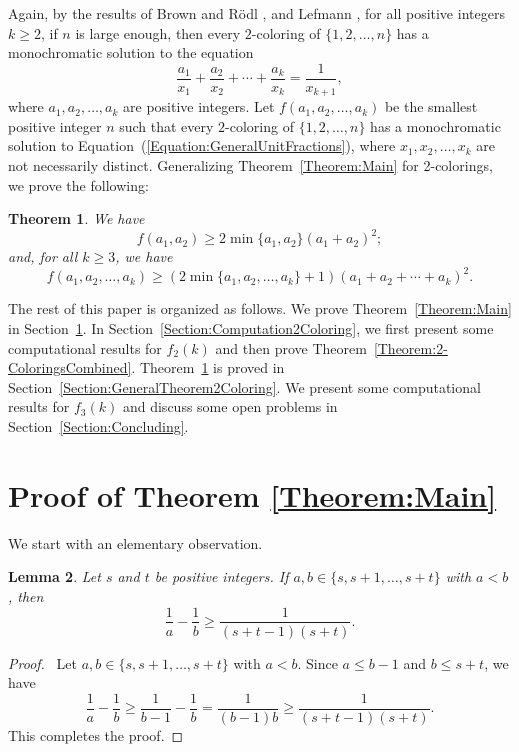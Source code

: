 \documentclass[11pt]{article}
\newtheorem{theorem}{Theorem}[section]
\newtheorem{lemma}[theorem]{Lemma}
\theoremstyle{definition}
\begin{document}
Again, by the results of Brown and R\"{o}dl \cite{BrownRodl1991}, and Lefmann \cite{Lefmann1991}, for all positive integers $k\geq2$, if $n$ is large enough, then every $2$-coloring of $\{1,2,\ldots,n\}$ has a monochromatic solution to the equation
\begin{equation}\label{Equation:GeneralUnitFractions}
    \frac{a_1}{x_1}+\frac{a_2}{x_2}+\cdots+\frac{a_k}{x_k}=\frac{1}{x_{k+1}},
\end{equation}
where $a_1,a_2,\ldots,a_k$ are positive integers. Let $f(a_1,a_2,\ldots,a_k)$ be the smallest positive integer $n$ such that every $2$-coloring of $\{1,2,\ldots,n\}$ has a monochromatic solution to Equation~(\ref{Equation:GeneralUnitFractions}), where $x_1,x_2,\ldots,x_k$ are not necessarily distinct. Generalizing Theorem~\ref{Theorem:Main} for 2-colorings, we prove the following:
\begin{theorem}\label{Theorem:General2-Coloring}
We have \[f(a_1,a_2)\geq2\min\{a_1,a_2\}(a_1+a_2)^2;\] and, for all $k\geq3$, we have
    \[
    f(a_1,a_2,\ldots,a_k)\geq(2\min\{a_1,a_2,\ldots,a_k\}+1)(a_1+a_2+\cdots+a_k)^2.
    \]
\end{theorem}



The rest of this paper is organized as follows. We prove Theorem~\ref{Theorem:Main} in Section~\ref{Section:ProofMainTheorem}. In Section~\ref{Section:Computation2Coloring}, we first present some computational results for $f_2(k)$ and then prove Theorem~\ref{Theorem:2-ColoringsCombined}. Theorem~\ref{Theorem:General2-Coloring} is proved in Section~\ref{Section:GeneralTheorem2Coloring}. We present some computational results for $f_3(k)$ and discuss some open problems in Section~\ref{Section:Concluding}.



\section{Proof of Theorem \ref{Theorem:Main}}\label{Section:ProofMainTheorem}
We start with an elementary observation.
\begin{lemma}\label{Lemma:Elementary}
    Let $s$ and $t$ be positive integers. If $a,b\in\{s,s+1,\ldots,s+t\}$ with $a<b$, then
    \[
    \frac{1}{a}-\frac{1}{b}\geq\frac{1}{(s+t-1)(s+t)}.
    \]
\end{lemma}
\begin{proof}\
Let $a,b\in\{s,s+1,\ldots,s+t\}$ with $a<b$. Since $a\leq b-1$ and $b\leq s+t$, we have
    \[
    \frac{1}{a}-\frac{1}{b}\geq\frac{1}{b-1}-\frac{1}{b}=\frac{1}{(b-1)b}\geq\frac{1}{(s+t-1)(s+t)}.
    \]
This completes the proof.
\end{proof}
\end{document}

